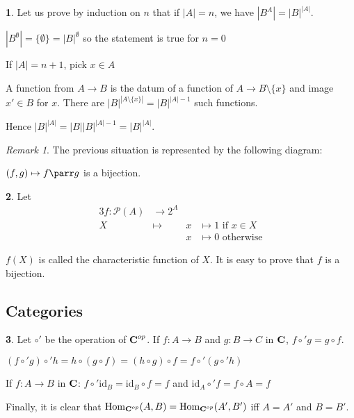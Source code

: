 \documentclass[11pt]{article}
\theoremstyle{definition}
\newtheorem{exo}{}[subsection]
\theoremstyle{remark}
\newtheorem*{rmq}{Remark}
\def\id{\mathrm{id}}
\def\Hom{\mathrm{Hom}}
\newcommand{\catname}[1]{{\normalfont\textbf{#1}}}
\newcommand{\Cat}{\catname{C}}
\begin{document}
\begin{exo}\label{card-functions}
	Let us prove by induction on $n$ that if $|A|=n$, we have $|B^A|=|B|^{|A|}$.

	$|B^\emptyset|=\{\emptyset\}=|B|^\emptyset$ so the statement is true for $n=0$

	If $|A|=n+1$, pick $x\in A$

	A function from $A\to B$ is the datum of a function of $A\to B\setminus\{x\}$ and image $x'\in B$ for $x$. There are $|B|^{|A\setminus\{x\}|}=|B|^{|A|-1}$ such functions.

	Hence $|B|^{|A|}=|B||B|^{|A|-1}=|B|^{|A|}$.
\end{exo}

\begin{rmq}
	The previous situation is represented by the following diagram:


	$(f,g)\mapsto f\parr g$ is a bijection.
\end{rmq}

\begin{exo}
	Let
	\begin{alignat*}{3}f:\mathcal P(A)&\to 2^A\\
									X&\mapsto& x&\mapsto 1\text{ if }x\in X\\
									&&x&\mapsto 0\text{ otherwise}
	\end{alignat*}

	$f(X)$ is called the characteristic function of $X$. It is easy to prove that $f$ is a bijection.
\end{exo}

\subsection{Categories}

\begin{exo}
	Let $\circ'$ be the operation of $\Cat^{op}$. If $f:A\to B$ and $g:B\to C$ in $\Cat$, $f\circ' g=g\circ f$.

	$(f\circ' g)\circ' h=h\circ(g\circ f)=(h\circ g)\circ f=f\circ'(g\circ' h)$

	If $f:A\to B$ in $\Cat$:
	$f\circ' \id_B=\id_B\circ f=f$ and $\id_A\circ' f=f\circ A=f$

	Finally, it is clear that $\Hom_{\Cat^{op}}(A,B)=\Hom_{\Cat^{op}}(A',B')$ iff $A=A'$ and $B=B'$. 
\end{exo}
\end{document}
